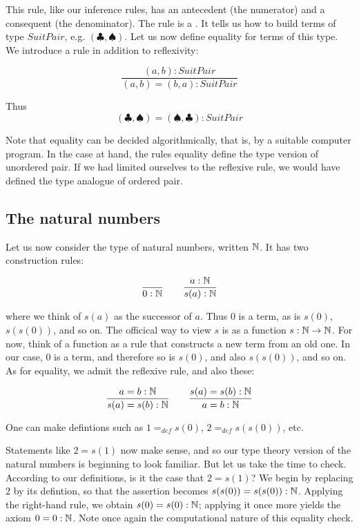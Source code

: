 This rule, like our inference rules, has an antecedent (the numerator) and a consequent (the denominator).  The rule is a .  It tells us how to build terms of type $SuitPair$, e.g. $(\clubsuit, \spadesuit)$.  Let us now define equality for terms of this type.  We introduce a rule in addition to reflexivity:

$$
\frac{(a,b) : SuitPair }{(a,b) = (b,a) : SuitPair}
$$

Thus
$$(\clubsuit, \spadesuit) = (\spadesuit, \clubsuit) : SuitPair
$$

Note that equality can be decided algorithmically, that is, by a suitable computer program.  In the case at hand, the rules equality define the type version of unordered pair.  If we had limited ourselves to the reflexive rule, we would have defined the type analogue of ordered pair.

\subsection{The natural numbers}


Let us now consider the type of natural numbers, written $\mathbb{N}$.  It has two construction rules:

$$
\frac{}{0 : \mathbb{N} } \qquad \frac{a : \mathbb{N}}{s(a) : \mathbb{N}}
$$

where we think of $s(a)$ as the successor of $a$.  Thus $0$ is a term, as is $s(0)$, $s(s(0))$, and so on.  The officical way to view $s$ is as a function $s : \mathbb{N} \to \mathbb{N}$.  For now, think of a function as a rule that constructs a new term from an old one.  In our case, $0$ is a term, and therefore so is $s(0)$, and also $s(s(0))$, and so on.  As for equality, we admit the reflexive rule, and also these:

$$
\frac{a = b : \mathbb{N}}{s(a)  = s(b) : \mathbb{N}}
\qquad
\frac{s(a)  = s(b) : \mathbb{N}}{a = b : \mathbb{N}}
$$

One can make defintions such as $1 =_{def}  s(0)$, $2 =_{def}  s(s(0))$, etc.

Statements like $2 = s(1)$ now make sense, and so our type theory version of the natural numbers is beginning to look familiar.   But let us take the time to check.  According to our definitions, is it the case that $2 = s(1)$?  We begin by replacing $2$ by its defintion, so that the assertion becomes $s(s(0)) = s(s(0)): \mathbb{N}$.  Applying the right-hand rule, we obtain $s(0) = s(0): \mathbb{N}$; applying it once more yields the axiom $0 = 0 : \mathbb{N}$. Note once again the computational nature of this equality check.


